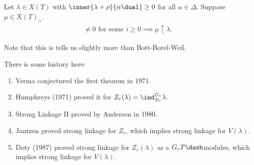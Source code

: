 \begin{theorem}

Let \(\lambda \in X(T)\) with
\(\inner{\lambda + \rho}{\alpha\dual} \geq 0\) for all
\(\alpha\in \Delta\). Suppose \(\mu \in X(T)_+\).
\begin{align*}
[H^i w\cdot \lambda : L(\mu)] \neq 0 \text{ for some } i\geq 0 \implies \mu \uparrow \lambda
.\end{align*}

\end{theorem}

\begin{remark}

Note that this is tells us slightly more than Bott-Borel-Weil.

\end{remark}

\begin{remark}

There is some history here:

\begin{enumerate}
\def\labelenumi{\arabic{enumi}.}
\item
  Verma conjectured the first theorem in 1971.
\item
  Humphreys (1971) proved it for
  \(Z_r(\lambda) = \ind_{B_r}^{G_r} \lambda\).
\item
  Strong Linkage II proved by Andersen in 1980.
\item
  Jantzen proved strong linkage for \(Z_r\), which implies strong
  linkage for \(V(\lambda)\).
\item
  Doty (1987) proved strong linkage for \(Z_r(\lambda)\) as a
  \(G_rT\dash\)modules, which implies strong linkage for \(V(\lambda)\).
\end{enumerate}

\end{remark}

